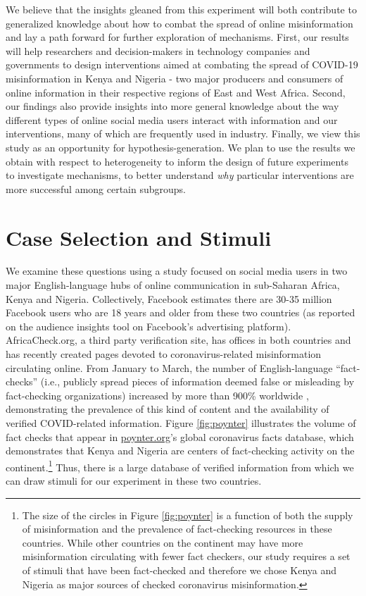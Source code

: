 \documentclass[letterpaper, 12pt, parskip=full,DIV=10]{scrartcl}
\begin{document}
We believe that the insights gleaned from this experiment will both contribute to generalized knowledge about how to combat the spread of online misinformation and lay a path forward for further exploration of mechanisms. First, our results will help researchers and decision-makers in technology companies and governments to design interventions aimed at combating the spread of COVID-19 misinformation in Kenya and Nigeria - two major producers and consumers of online information in their respective regions of East and West Africa. Second, our findings also provide insights into more general knowledge about the way different types of online social media users interact with information and our interventions, many of which are frequently used in industry. Finally, we view this study as an opportunity for hypothesis-generation. We plan to use the results we obtain with respect to heterogeneity to inform the design of future experiments to investigate mechanisms, to better understand \textit{why} particular interventions are more successful among certain subgroups.


\section{Case Selection and Stimuli}

We examine these questions using a study focused on social media users in two major English-language hubs of online communication in sub-Saharan Africa, Kenya and Nigeria.  Collectively, Facebook estimates there are 30-35 million Facebook users who are 18 years and older from these two countries (as reported on the audience insights tool on Facebook's advertising platform). AfricaCheck.org, a third party verification site, has offices in both countries and has recently created pages devoted to coronavirus-related misinformation circulating online. From January to March, the number of English-language ``fact-checks'' (i.e., publicly spread pieces of information deemed false or misleading by fact-checking organizations) increased by more than 900\% worldwide \citep{brennen2020types}, demonstrating the prevalence of this kind of content and the availability of verified COVID-related information. Figure \ref{fig:poynter} illustrates the volume of fact checks that appear in \url{poynter.org}'s global coronavirus facts database, which demonstrates that Kenya and Nigeria are centers of fact-checking activity on the continent.\footnote{The size of the circles in Figure \ref{fig:poynter} is a function of both the supply of misinformation and the prevalence of fact-checking resources in these countries. While other countries on the continent may have more misinformation circulating with fewer fact checkers, our study requires a set of stimuli that have been fact-checked and therefore we chose Kenya and Nigeria as major sources of checked coronavirus misinformation.}  Thus, there is a large database of verified information from which we can draw stimuli for our experiment in these two countries. 
\end{document}
